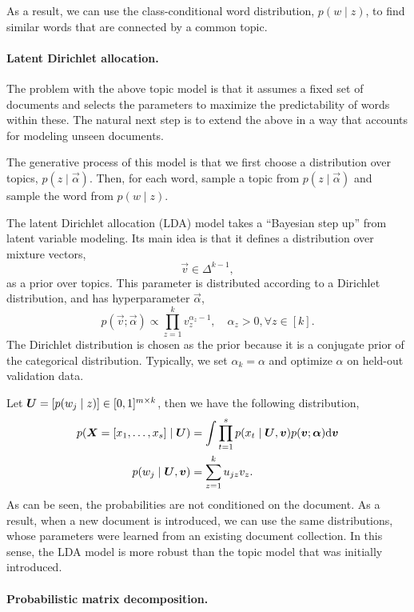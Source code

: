 As a result, we can use the class-conditional word distribution, $p(w \mid z)$, to find similar
words that are connected by a common topic.

\paragraph{Latent Dirichlet allocation.}

The problem with the above topic model is that it assumes a fixed set of documents and selects the
parameters to maximize the predictability of words within these. The natural next step is to extend
the above in a way that accounts for modeling unseen documents.

The generative process of this model is that we first choose a distribution over topics, $p(z\mid
    \vec{\alpha})$. Then, for each word, sample a topic from $p(z \mid \vec{\alpha})$ and sample the
word from $p(w \mid z)$.

The latent Dirichlet allocation (LDA) model takes a ``Bayesian step up'' from latent variable
modeling. Its main idea is that it defines a distribution over mixture vectors, \[
    \vec{v} \in \Delta^{k-1},
\]
as a prior over topics. This parameter is distributed according to a Dirichlet distribution, and
has hyperparameter $\vec{\alpha}$, \[
    p(\vec{v}; \vec{\alpha}) \propto \prod_{z=1}^{k} v_z^{\alpha_z - 1}, \quad \alpha_z > 0, \forall z \in [k].
\]
The Dirichlet distribution is chosen as the prior because it is a conjugate prior of the
categorical distribution. Typically, we set $\alpha_k = \alpha$ and optimize $\alpha$ on held-out
validation data.

Let $\bm{U} = [p(w_j \mid z)] \in [0,1]^{m \times k}$, then we have the following distribution,
\begin{align*}
    p(\bm{X}=[x_1, \ldots, x_s] \mid \bm{U}) & = \int \prod_{t=1}^{s} p(x_t \mid \bm{U}, \bm{v}) p(\bm{v}; \bm{\alpha}) \mathrm{d}\bm{v} \\
    p(w_j \mid \bm{U}, \bm{v})               & = \sum_{z=1}^{k} u_{jz} v_z.
\end{align*}
As can be seen, the probabilities are not conditioned on the document. As a result, when a
new document is introduced, we can use the same distributions, whose parameters were learned from an
existing document collection. In this sense, the LDA model is more robust than the topic model that
was initially introduced.

\paragraph{Probabilistic matrix decomposition.}

